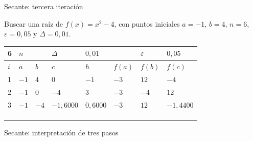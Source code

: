 \documentclass[original_version/main.tex]{subfiles}
\begin{document}
\begin{frame}[t]{Secante: tercera iteración}
\begin{minipage}[t][13mm][t]{\textwidth}\small Buscar una raíz de $f(x)=x^2-4$, con puntos iniciales $a=-1$, $b=4$, $n=6$, $\varepsilon=0{,}05$ y $\Delta=0{,}01$.\end{minipage}\par{\scriptsize\setlength{\tabcolsep}{2pt}\renewcommand{\arraystretch}{1}\begin{center}\begin{tabular}{|C{.04\textwidth}|C{.112\textwidth}|C{.112\textwidth}|C{.112\textwidth}|C{.112\textwidth}|C{.112\textwidth}|C{.112\textwidth}|C{.112\textwidth}|}
\hline
\rule{0pt}{4.3mm}6 & $n$ &  &  $\Delta$  & $0{,}01$ &  & $\varepsilon$ & $0{,}05$\\\hline
\rule{0pt}{4.3mm}$i$ & $a$ & $b$ & $c$ & $h$ & $f(a)$ & $f(b)$ & $f(c)$\\\hline
\rule{0pt}{4.3mm}1 & $-1$ & $4$ & $0$ & $-1$ & $-3$ & $12$ & $-4$\\\hline
\rule{0pt}{4.3mm}2 & $-1$ & $0$ & $-4$ & $3$ & $-3$ & $-4$ & $12$\\\hline
\rule{0pt}{4.3mm}3 & $-1$ & $-4$ & $-1{,}6000$ & $0{,}6000$ & $-3$ & $12$ & $-1{,}4400$\\\hline
\rule{0pt}{4.3mm} &  &  &  &  &  &  & \\\hline
\rule{0pt}{4.3mm} &  &  &  &  &  &  & \\\hline
\rule{0pt}{4.3mm} &  &  &  &  &  &  & \\\hline
\end{tabular}\end{center}}\begin{minipage}[t][10mm][t]{\textwidth}\footnotesize \end{minipage}
\end{frame}

\begin{frame}{Secante: interpretación de tres pasos}
\end{frame}
\end{document}
